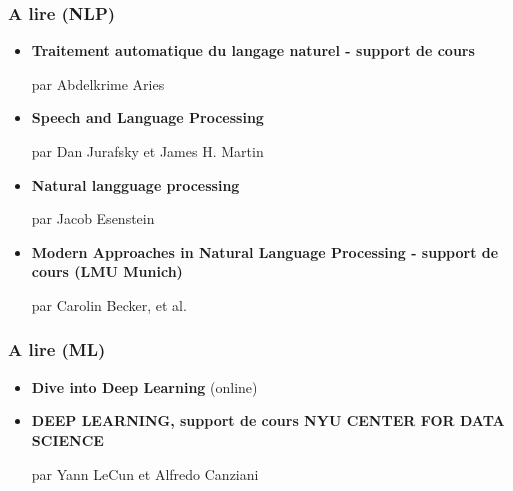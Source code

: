 \documentclass{beamer}
\begin{document}
\begin{frame}
	\frametitle{A lire (NLP)}
	
	\begin{itemize}
		
		\item \textbf{Traitement automatique du langage naturel - support de cours}
		
		par Abdelkrime Aries
		
		
		
		\item \textbf{Speech and Language Processing} 
		
		par Dan Jurafsky et James H. Martin
		
		
		\item \textbf{Natural langguage processing}
		
		par Jacob Esenstein 
		
		
		\item \textbf{Modern Approaches in Natural Language Processing - support de cours (LMU Munich)}
		
		par Carolin Becker, et al.
		
		
		
		
	\end{itemize}
	
\end{frame}

\begin{frame}
	\frametitle{A lire (ML)}
	
	\begin{itemize}
		
		
		\item \textbf{Dive into Deep Learning} (online)
		
		
		\item \textbf{DEEP LEARNING, support de cours NYU CENTER FOR DATA SCIENCE} 
		
		par Yann LeCun et  Alfredo Canziani
		
		
		
	\end{itemize}
	
\end{frame}
\end{document}
